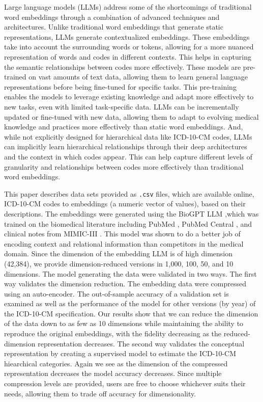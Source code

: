 \documentclass{bmcart}
\begin{document}
Large language models (LLMs) address some of the shortcomings of traditional 
word embeddings through a combination of advanced techniques and 
architectures. Unlike traditional word embeddings that generate static 
representations, LLMs generate contextualized embeddings. 
These embeddings take into account the surrounding words or tokens, allowing 
for a more nuanced representation of words and codes in different contexts. 
This helps in capturing the semantic relationships between codes more 
effectively. These models are pre-trained on vast amounts of text data, 
allowing them to learn general language representations before being 
fine-tuned for specific tasks. This pre-training enables the models to 
leverage existing knowledge and adapt more effectively to new tasks, even 
with limited task-specific data. LLMs can be incrementally 
updated or fine-tuned with new data, allowing them to adapt to evolving 
medical knowledge and practices more effectively than static word embeddings. 
And, while not explicitly designed for hierarchical data like ICD-10-CM codes, 
LLMs can implicitly learn hierarchical relationships through 
their deep architectures and the context in which codes appear. This can help 
capture different levels of granularity and relationships between codes more 
effectively than traditional word embeddings.

This paper describes data sets provided as \texttt{.csv} files, which are 
available online, ICD-10-CM codes 
to embeddings (a numeric vector of values), based on their descriptions. The 
embeddings were generated using the BioGPT LLM \cite{luo2022},which was trained on the biomedical literature including PubMed \cite{pubmed}, 
PubMed Central \cite{pubmedcentral}, and clinical notes from MIMIC-III 
\cite{mimiciii}. This model was shown to do 
a better job of encoding context and relational information than competitors 
in the medical domain. Since the dimension of the embedding LLM is of high 
dimension (42,384), we provide dimension-reduced versions in 1,000, 100, 50, 
and 10 dimensions. The model generating the data were validated in two ways. 
The first way validates the dimension reduction. The embedding data were 
compressed using an auto-encoder. The out-of-sample accuracy of a validation 
set is examined as well as the performance of the model for other versions 
(by year) of the ICD-10-CM specification. Our results show that we can reduce 
the dimension of the data down to as few as 10 dimensions while maintaining 
the ability to reproduce the original embeddings, with the fidelity decreasing 
as the reduced-dimension representation decreases. The second way validates 
the conceptual representation by creating a supervised model to estimate the 
ICD-10-CM hiearchical categories. Again we see as the dimension of the 
compressed representation decreases the model accuracy decreases. Since 
multiple compression levels are provided, users are free to choose whichever 
suits their needs, allowing them to trade off accuracy for dimensionality.
\end{document}
